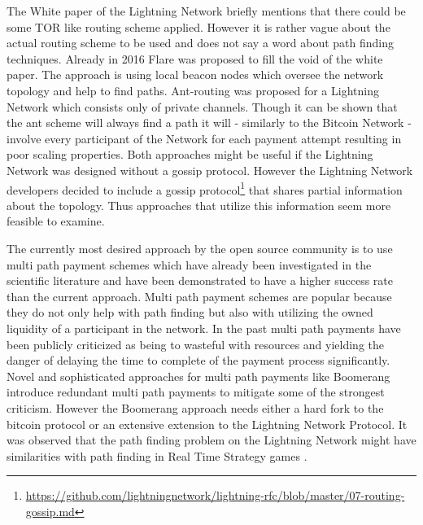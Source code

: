 \documentclass[a4paper]{paper}
\begin{document}
The White paper of the Lightning Network \cite{poon2016bitcoin} briefly mentions that there could be some TOR like routing scheme applied.
However it is rather vague about the actual routing scheme to be used and does not say a word about path finding techniques.
Already in 2016 Flare \cite{prihodko2016flare} was proposed to fill the void of the white paper.
The approach is using local beacon nodes which oversee the network topology and help to find paths.
Ant-routing \cite{grunspan2018ant} was proposed for a Lightning Network which consists only of private channels.
Though it can be shown that the ant scheme will always find a path it will - similarly to the Bitcoin Network - involve every participant of the Network for each payment attempt resulting in poor scaling properties.
Both approaches might be useful if the Lightning Network was designed without a gossip protocol.
However the Lightning Network developers decided to include a gossip protocol\footnote{\url{https://github.com/lightningnetwork/lightning-rfc/blob/master/07-routing-gossip.md}} that shares partial information about the topology.
Thus approaches that utilize this information seem more feasible to examine.

The currently most desired approach by the open source community is to use multi path payment schemes \cite{osuntokun2018AMP} which have already been investigated \cite{piatkivskyi2018split} in the scientific literature and have been demonstrated to have a higher success rate than the current approach.
Multi path payment schemes are popular because they do not only help with path finding but also with utilizing the owned liquidity of a participant in the network.
In the past multi path payments have been publicly criticized \cite{pickhardt2019pathfinding} as being to wasteful with resources and yielding the danger of delaying the time to complete of the payment process significantly.
Novel and sophisticated approaches for multi path payments like Boomerang \cite{bagaria2019boomerang} introduce redundant multi path payments to mitigate some of the strongest criticism.
However the Boomerang approach needs either a hard fork to the bitcoin protocol or an extensive extension to the Lightning Network Protocol. 
It was observed that the path finding problem on the Lightning Network might have similarities with path finding in Real Time Strategy games \cite{zmnscpxj2019rts}.
\end{document}
